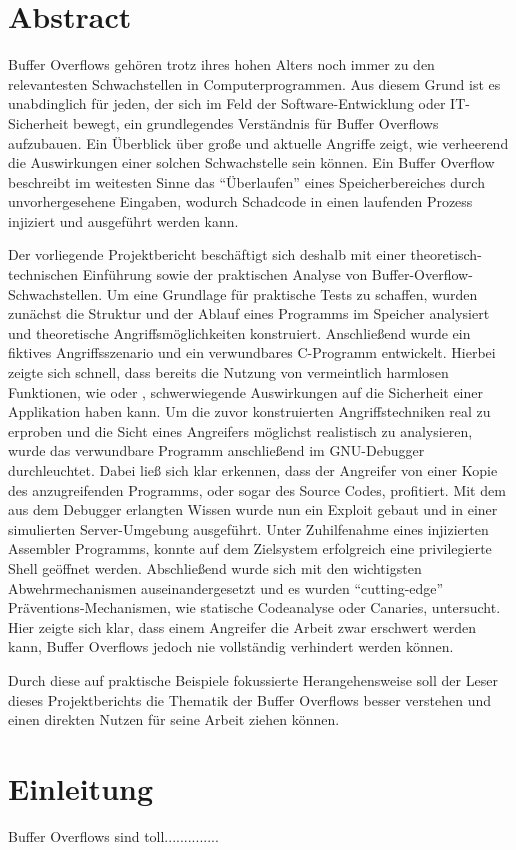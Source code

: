 \section{Abstract}
Buffer Overflows gehören trotz ihres hohen Alters noch immer zu den relevantesten Schwachstellen in Computerprogrammen.
Aus diesem Grund ist es unabdinglich für jeden, der sich im Feld der Software-Entwicklung oder IT-Sicherheit bewegt, 
ein grundlegendes Verständnis für Buffer Overflows aufzubauen. Ein Überblick über große und aktuelle Angriffe zeigt, 
wie verheerend die Auswirkungen einer solchen Schwachstelle sein können. Ein Buffer Overflow beschreibt im weitesten 
Sinne das “Überlaufen” eines Speicherbereiches durch unvorhergesehene Eingaben, wodurch Schadcode in einen laufenden 
Prozess injiziert und ausgeführt werden kann.

Der vorliegende Projektbericht beschäftigt sich deshalb mit einer theoretisch-technischen Einführung sowie der praktischen 
Analyse von Buffer-Overflow-Schwachstellen. Um eine Grundlage für praktische Tests zu schaffen, wurden zunächst  
die Struktur und der Ablauf eines Programms im Speicher analysiert und theoretische Angriffsmöglichkeiten konstruiert.
Anschließend wurde ein fiktives Angriffsszenario und ein verwundbares C-Programm entwickelt. Hierbei zeigte sich schnell,
dass bereits die Nutzung von vermeintlich harmlosen Funktionen, wie  oder , schwerwiegende Auswirkungen
auf die Sicherheit einer Applikation haben kann. Um die zuvor konstruierten Angriffstechniken real zu erproben und die
Sicht eines Angreifers möglichst realistisch zu analysieren, wurde das verwundbare Programm anschließend im GNU-Debugger
durchleuchtet. Dabei ließ sich klar erkennen, dass der Angreifer von einer Kopie des anzugreifenden Programms, oder sogar
des Source Codes, profitiert. Mit dem aus dem Debugger erlangten Wissen wurde nun ein Exploit gebaut und in einer
simulierten Server-Umgebung ausgeführt. Unter Zuhilfenahme eines injizierten Assembler Programms, konnte auf dem
Zielsystem erfolgreich eine privilegierte Shell geöffnet werden.
Abschließend wurde sich mit den wichtigsten
Abwehrmechanismen auseinandergesetzt und es wurden “cutting-edge” Präventions-Mechanismen,
wie statische Codeanalyse oder Canaries, untersucht. Hier zeigte sich klar,
dass einem Angreifer die Arbeit zwar erschwert werden kann,
Buffer Overflows jedoch nie vollständig verhindert werden können.

Durch diese auf praktische Beispiele fokussierte Herangehensweise soll der Leser dieses Projektberichts die Thematik
der Buffer Overflows besser verstehen und einen direkten Nutzen für seine Arbeit ziehen können.
\pagebreak

\section{Einleitung}
Buffer Overflows sind toll..............
